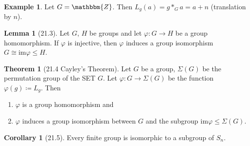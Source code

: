 \documentclass{article}
\newcommand{\Z}{\mathbbm{Z}}
\newcommand{\coleq}{\coloneqq}
\newcommand{\func}[3]{#1: #2 \to #3}
\theoremstyle{definition}
\newtheorem*{cor}{Corollary}
\newtheorem*{thm}{Theorem}
\newtheorem*{ex}{Example}
\newtheorem*{lem}{Lemma}
\theoremstyle{remark}
\newcommand{\im}{\mathrm{im}}
\newcommand{\iso}{\cong}
\begin{document}
{{        \begin{ex}
            Let $G=\Z$. Then $L_g(a)=g*_Ga=a+n$ (translation by $n$).
        \end{ex}
        
        \begin{lem}[21.3]
            Let $G$, $H$ be groups and let $\func{\varphi}{G}{H}$ be a group homomorphism. If $\varphi$ is injective, then $\varphi$ induces a group isomorphism $G\iso \im\varphi\leq H$.
        \end{lem}
        
        \begin{thm}[21.4 Cayley's Theorem]
            Let $G$ be a group, $\Sigma(G)$ be the permutation group of the SET $G$. Let $\func{\varphi}{G}{\Sigma(G)}$ be the function $\varphi(g)\coleq L_g$. Then
            \begin{enumerate}
                \item $\varphi$ is a group homomorphism and
                \item $\varphi$ induces a group isomorphism between $G$ and the subgroup $\im\varphi\leq \Sigma(G)$.
            \end{enumerate}
        \end{thm}
        
        \begin{cor}[21.5]
            Every finite group is isomorphic to a subgroup of $S_n$.
        \end{cor}
        }
    }
    
\end{document}
